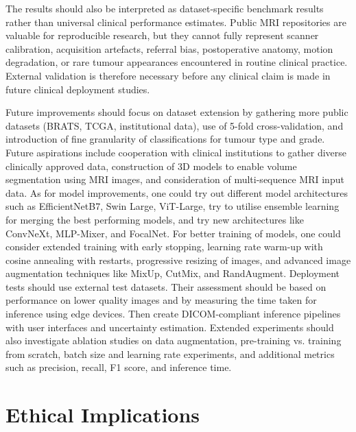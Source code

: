 \documentclass[final,3p,times,number]{elsarticle}
\begin{document}
The results should also be interpreted as dataset-specific benchmark results rather than universal clinical performance estimates. Public MRI repositories are valuable for reproducible research, but they cannot fully represent scanner calibration, acquisition artefacts, referral bias, postoperative anatomy, motion degradation, or rare tumour appearances encountered in routine clinical practice. External validation is therefore necessary before any clinical claim is made in future clinical deployment studies.

Future improvements should focus on dataset extension by gathering more public datasets (BRATS, TCGA, institutional data), use of 5-fold cross-validation, and introduction of fine granularity of classifications for tumour type and grade. Future aspirations include cooperation with clinical institutions to gather diverse clinically approved data, construction of 3D models to enable volume segmentation using MRI images, and consideration of multi-sequence MRI input data. As for model improvements, one could try out different model architectures such as EfficientNetB7, Swin Large, ViT-Large, try to utilise ensemble learning for merging the best performing models, and try new architectures like ConvNeXt, MLP-Mixer, and FocalNet. For better training of models, one could consider extended training with early stopping, learning rate warm-up with cosine annealing with restarts, progressive resizing of images, and advanced image augmentation techniques like MixUp, CutMix, and RandAugment. Deployment tests should use external test datasets. Their assessment should be based on performance on lower quality images and by measuring the time taken for inference using edge devices. Then create DICOM-compliant inference pipelines with user interfaces and uncertainty estimation. Extended experiments should also investigate ablation studies on data augmentation, pre-training vs. training from scratch, batch size and learning rate experiments, and additional metrics such as precision, recall, F1 score, and inference time.

\section{Ethical Implications}
\end{document}
